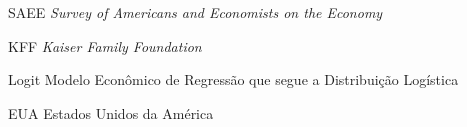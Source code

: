 
\listoffigures*
\cleardoublepage



\listoftables*
\cleardoublepage

\begin{siglas}
	\item[SAEE] \textit{Survey of Americans and Economists on the Economy}
	\item[KFF] \textit{Kaiser Family Foundation}
	\item[Logit] Modelo Econômico de Regressão que segue a Distribuição Logística 
	\item[EUA] Estados Unidos da América 
\end{siglas}




